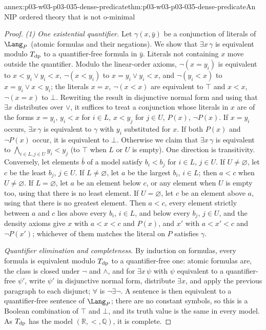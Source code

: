 \begin{annexitem}{annex:p03-w03-p03-035-dense-predicate}{thm:p03-w03-p03-035-dense-predicate}{An NIP ordered theory that is not o-minimal}
\begin{proof}
\emph{(1) One existential quantifier.}  Let \(\gamma(x,\bar y)\) be a
conjunction of literals of \(\Lang_P\) (atomic formulas and their
negations).  We show that \(\exists x\,\gamma\) is equivalent modulo
\(T_{\rm dp}\) to a quantifier-free formula in \(\bar y\).  Literals not
containing \(x\) move outside the quantifier.  Modulo the linear-order
axioms, \(\neg(x=y_i)\) is equivalent to \(x<y_i\vee y_i<x\),
\(\neg(x<y_i)\) to \(x=y_i\vee y_i<x\), and \(\neg(y_i<x)\) to
\(x=y_i\vee x<y_i\); the literals \(x=x\), \(\neg(x<x)\) are equivalent to
\(\top\) and \(x<x\), \(\neg(x=x)\) to \(\bot\).  Rewriting the result in
disjunctive normal form and using that \(\exists x\) distributes over
\(\vee\), it suffices to treat a conjunction whose literals in \(x\) are of
the forms \(x=y_i\), \(y_i<x\) for \(i\in L\), \(x<y_j\) for \(j\in U\),
\(P(x)\), \(\neg P(x)\).  If \(x=y_i\) occurs, \(\exists x\,\gamma\) is
equivalent to \(\gamma\) with \(y_i\) substituted for \(x\).  If both
\(P(x)\) and \(\neg P(x)\) occur, it is equivalent to \(\bot\).  Otherwise
we claim that \(\exists x\,\gamma\) is equivalent to
\(\bigwedge_{i\in L,j\in U}y_i<y_j\) (to \(\top\) when \(L\) or \(U\) is
empty).  One direction is transitivity.  Conversely, let elements \(\bar b\)
of a model satisfy \(b_i<b_j\) for \(i\in L\), \(j\in U\).  If
\(U\neq\varnothing\), let \(c\) be the least \(b_j\), \(j\in U\).  If
\(L\neq\varnothing\), let \(a\) be the largest \(b_i\), \(i\in L\); then
\(a<c\) when \(U\neq\varnothing\).  If \(L=\varnothing\), let \(a\) be an
element below \(c\), or any element when \(U\) is empty too, using that
there is no least element.  If \(U=\varnothing\), let \(c\) be an element
above \(a\), using that there is no greatest element.  Then \(a<c\), every
element strictly between \(a\) and \(c\) lies above every \(b_i\), \(i\in
L\), and below every \(b_j\), \(j\in U\), and the density axioms give \(x\) with \(a<x<c\) and \(P(x)\), and \(x'\) with
\(a<x'<c\) and \(\neg P(x')\); whichever of them matches the literal on
\(P\) satisfies \(\gamma\).

\emph{Quantifier elimination and completeness.}  By induction on formulas,
every formula is equivalent modulo \(T_{\rm dp}\) to a quantifier-free one:
atomic formulas are, the class is closed under \(\neg\) and \(\wedge\), and
for \(\exists x\,\psi\) with \(\psi\) equivalent to a quantifier-free
\(\psi'\), write \(\psi'\) in disjunctive normal form, distribute
\(\exists x\), and apply the previous paragraph to each disjunct; \(\forall\)
is \(\neg\exists\neg\).  A sentence is then equivalent to a quantifier-free
sentence of \(\Lang_P\); there are no constant symbols, so this is a
Boolean combination of \(\top\) and \(\bot\), and its truth value is the
same in every model.  As \(T_{\rm dp}\) has the model
\((\mathbb R,<,\mathbb Q)\), it is complete.


\end{proof}
\end{annexitem}
